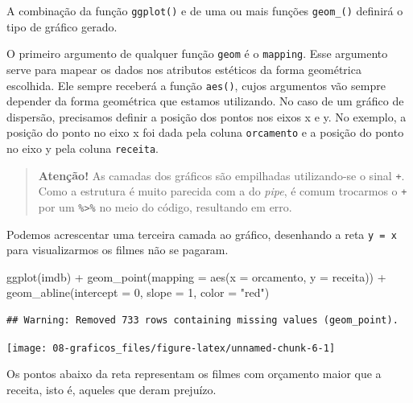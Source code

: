 \documentclass[
]{book}
\newenvironment{Shaded}{\begin{snugshade}}{\end{snugshade}}
\newcommand{\AttributeTok}[1]{\textcolor[rgb]{0.77,0.63,0.00}{#1}}
\newcommand{\DecValTok}[1]{\textcolor[rgb]{0.00,0.00,0.81}{#1}}
\newcommand{\FunctionTok}[1]{\textcolor[rgb]{0.00,0.00,0.00}{#1}}
\newcommand{\NormalTok}[1]{#1}
\newcommand{\SpecialCharTok}[1]{\textcolor[rgb]{0.00,0.00,0.00}{#1}}
\newcommand{\StringTok}[1]{\textcolor[rgb]{0.31,0.60,0.02}{#1}}
\begin{document}
A combinação da função \texttt{ggplot()} e de uma ou mais funções \texttt{geom\_()} definirá o tipo de gráfico gerado.

O primeiro argumento de qualquer função \texttt{geom} é o \texttt{mapping}. Esse argumento serve para mapear os dados nos atributos estéticos da forma geométrica escolhida. Ele sempre receberá a função \texttt{aes()}, cujos argumentos vão sempre depender da forma geométrica que estamos utilizando. No caso de um gráfico de dispersão, precisamos definir a posição dos pontos nos eixos x e y. No exemplo, a posição do ponto no eixo x foi dada pela coluna \texttt{orcamento} e a posição do ponto no eixo y pela coluna \texttt{receita}.

\begin{quote}
\textbf{Atenção!} As camadas dos gráficos são empilhadas utilizando-se o sinal \texttt{+}. Como a estrutura é muito parecida com a do \emph{pipe}, é comum trocarmos o \texttt{+} por um \texttt{\%\textgreater{}\%} no meio do código, resultando em erro.
\end{quote}

Podemos acrescentar uma terceira camada ao gráfico, desenhando a reta \texttt{y\ =\ x} para visualizarmos os filmes não se pagaram.

\begin{Shaded}
\begin{Highlighting}[]
\FunctionTok{ggplot}\NormalTok{(imdb) }\SpecialCharTok{+}
  \FunctionTok{geom\_point}\NormalTok{(}\AttributeTok{mapping =} \FunctionTok{aes}\NormalTok{(}\AttributeTok{x =}\NormalTok{ orcamento, }\AttributeTok{y =}\NormalTok{ receita)) }\SpecialCharTok{+}
  \FunctionTok{geom\_abline}\NormalTok{(}\AttributeTok{intercept =} \DecValTok{0}\NormalTok{, }\AttributeTok{slope =} \DecValTok{1}\NormalTok{, }\AttributeTok{color =} \StringTok{"red"}\NormalTok{)}
\end{Highlighting}
\end{Shaded}

\begin{verbatim}
## Warning: Removed 733 rows containing missing values (geom_point).
\end{verbatim}

\begin{center}\texttt{[image: 08-graficos\_files/figure-latex/unnamed-chunk-6-1]} \end{center}

Os pontos abaixo da reta representam os filmes com orçamento maior que a receita, isto é, aqueles que deram prejuízo.
\end{document}
